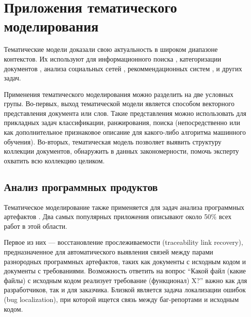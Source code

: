 \section{Приложения тематического моделирования}



Тематические модели доказали свою актуальность в широком диапазоне контекстов\cite{fntir2017applications}. Их используют для информационного поиска \cite{yi2009, wang2011}, категоризации документов \cite{rubin2012}, анализа социальных сетей \cite{varshney2014, pinto2016}, рекоммендационных систем \cite{wang2011}, \cite{lee2015} и других задач.

Применения тематического моделирования можно разделить на две условных групы. Во-первых, выход тематической модели является способом векторного представления документа или слов. Такие представления можно использовать для прикладных задач классификации, ранжирования, поиска (непосредственно или как дополнительное признаковое описание для какого-либо алгоритма машинного обучения). Во-вторых, тематическая модель позволяет выявить структуру коллекции документов, обнаружить в данных закономерности, помочь эксперту охватить всю коллекцию целиком.

\subsection{Анализ программных продуктов}

Тематическое моделирование также применяется для задач анализа программных артефактов \cite{sun2016exploring,chen2016survey}. Два самых популярных приложения описывают около 50\% всех работ в этой области\cite{chen2016survey}. 

Первое из них --- восстановление прослеживаемости (traceability link recovery), предназначенное для автоматического выявления связей между парами разнородных программных артефактов, таких как документы с исходным кодом и документы с требованиями\cite{asuncion2010software}. Возможность ответить на вопрос ``Какой файл (какие файлы) с исходным кодом реализует требование (функционал) X?'' важно как для разработчиков, так и для заказчика. Близкой является задача локализации ошибок (bug localization), при которой ищется связь между баг-репортами и исходным кодом.

